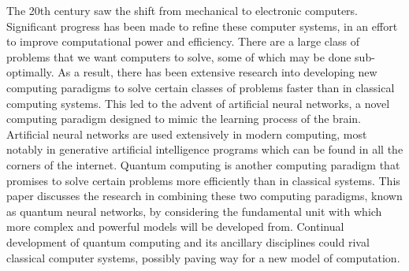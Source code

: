 \documentclass[twocolumn,superscriptaddress]{revtex4-1}
\begin{document}
The 20th century saw the shift from mechanical to electronic computers. Significant progress has been made to refine these computer systems, in an effort to improve computational power and efficiency. There are a large class of problems that we want computers to solve, some of which may be done sub-optimally. As a result, there has been extensive research into developing new computing paradigms to solve certain classes of problems faster than in classical computing systems. This led to the advent of artificial neural networks, a novel computing paradigm designed to mimic the learning process of the brain. Artificial neural networks are used extensively in modern computing, most notably in generative artificial intelligence programs which can be found in all the corners of the internet. Quantum computing is another computing paradigm that promises to solve certain problems more efficiently than in classical systems. This paper discusses the research in combining these two computing paradigms, known as quantum neural networks, by considering the fundamental unit with which more complex and powerful models will be developed from. Continual development of quantum computing and its ancillary disciplines could rival classical computer systems, possibly paving way for a new model of computation.
\end{document}
